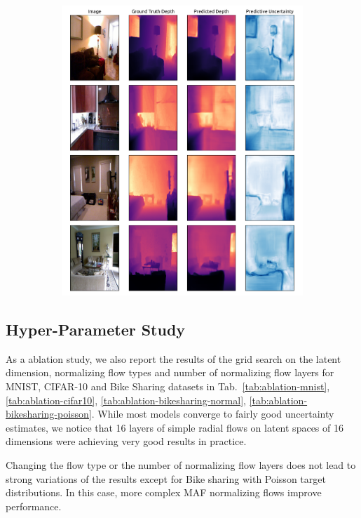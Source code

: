 \begin{figure}[ht!]
\begin{subfigure}[t]{.5\textwidth}
        \includegraphics[width=1\textwidth]{sections/007_iclr2022/resources/appendix/nyu-84-new-ii.pdf}
    \end{subfigure}%
\end{figure}


\subsection{Hyper-Parameter Study}
\label{sec:ablation-study}

As a ablation study, we also report the results of the grid search on the latent dimension, normalizing flow types and number of normalizing flow layers for MNIST, CIFAR-10 and Bike Sharing datasets in Tab.~\ref{tab:ablation-mnist}, \ref{tab:ablation-cifar10}, \ref{tab:ablation-bikesharing-normal}, \ref{tab:ablation-bikesharing-poisson}. While most models converge to fairly good uncertainty estimates, we notice that 16 layers of simple radial flows on latent spaces of 16 dimensions were achieving very good results in practice. 

Changing the flow type or the number of normalizing flow layers does not lead to strong variations of the results except for Bike sharing with Poisson target distributions. In this case, more complex MAF normalizing flows improve \NatPNacro{} performance. 

